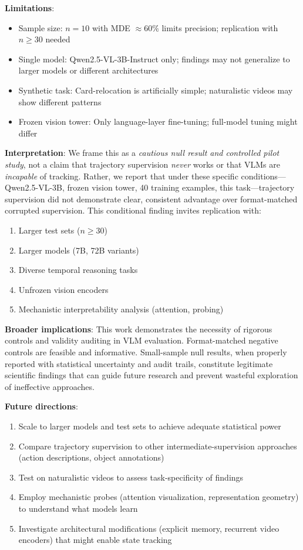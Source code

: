 \textbf{Limitations}:
\begin{itemize}
    \item Sample size: $n=10$ with MDE $\approx 60\%$ limits precision; replication with $n \geq 30$ needed
    \item Single model: Qwen2.5-VL-3B-Instruct only; findings may not generalize to larger models or different architectures
    \item Synthetic task: Card-relocation is artificially simple; naturalistic videos may show different patterns
    \item Frozen vision tower: Only language-layer fine-tuning; full-model tuning might differ
\end{itemize}

\textbf{Interpretation}:
We frame this as a \emph{cautious null result and controlled pilot study}, not a claim that trajectory supervision \emph{never} works or that VLMs are \emph{incapable} of tracking. Rather, we report that under these specific conditions---Qwen2.5-VL-3B, frozen vision tower, 40 training examples, this task---trajectory supervision did not demonstrate clear, consistent advantage over format-matched corrupted supervision. This conditional finding invites replication with:
\begin{enumerate}
    \item Larger test sets ($n \geq 30$)
    \item Larger models (7B, 72B variants)
    \item Diverse temporal reasoning tasks
    \item Unfrozen vision encoders
    \item Mechanistic interpretability analysis (attention, probing)
\end{enumerate}

\textbf{Broader implications}:
This work demonstrates the necessity of rigorous controls and validity auditing in VLM evaluation. Format-matched negative controls are feasible and informative. Small-sample null results, when properly reported with statistical uncertainty and audit trails, constitute legitimate scientific findings that can guide future research and prevent wasteful exploration of ineffective approaches.

\textbf{Future directions}:
\begin{enumerate}
    \item Scale to larger models and test sets to achieve adequate statistical power
    \item Compare trajectory supervision to other intermediate-supervision approaches (action descriptions, object annotations)
    \item Test on naturalistic videos to assess task-specificity of findings
    \item Employ mechanistic probes (attention visualization, representation geometry) to understand what models learn
    \item Investigate architectural modifications (explicit memory, recurrent video encoders) that might enable state tracking
\end{enumerate}

